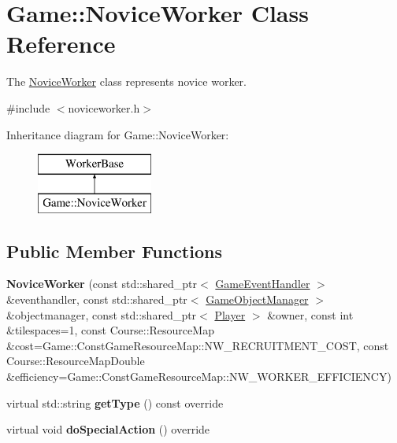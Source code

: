 \hypertarget{class_game_1_1_novice_worker}{\section{Game\-:\-:Novice\-Worker Class Reference}
\label{class_game_1_1_novice_worker}
}


The \hyperlink{class_game_1_1_novice_worker}{Novice\-Worker} class represents novice worker.  




{\ttfamily \#include $<$noviceworker.\-h$>$}

Inheritance diagram for Game\-:\-:Novice\-Worker\-:\begin{figure}[H]
\begin{center}
\leavevmode
\includegraphics[height=2.000000cm]{class_game_1_1_novice_worker}
\end{center}
\end{figure}
\subsection*{Public Member Functions}
\begin{DoxyCompactItemize}
\item 
\hypertarget{class_game_1_1_novice_worker_ab98dc21c53659739b108abf2f8e0db7a}{{\bfseries Novice\-Worker} (const std\-::shared\-\_\-ptr$<$ \hyperlink{class_game_1_1_game_event_handler}{Game\-Event\-Handler} $>$ \&eventhandler, const std\-::shared\-\_\-ptr$<$ \hyperlink{class_game_1_1_game_object_manager}{Game\-Object\-Manager} $>$ \&objectmanager, const std\-::shared\-\_\-ptr$<$ \hyperlink{class_game_1_1_player}{Player} $>$ \&owner, const int \&tilespaces=1, const Course\-::\-Resource\-Map \&cost=Game\-::\-Const\-Game\-Resource\-Map\-::\-N\-W\-\_\-\-R\-E\-C\-R\-U\-I\-T\-M\-E\-N\-T\-\_\-\-C\-O\-S\-T, const Course\-::\-Resource\-Map\-Double \&efficiency=Game\-::\-Const\-Game\-Resource\-Map\-::\-N\-W\-\_\-\-W\-O\-R\-K\-E\-R\-\_\-\-E\-F\-F\-I\-C\-I\-E\-N\-C\-Y)}\label{class_game_1_1_novice_worker_ab98dc21c53659739b108abf2f8e0db7a}

\item 
\hypertarget{class_game_1_1_novice_worker_a3a008e67e7a009bab02ac9f2a207b7b9}{virtual std\-::string {\bfseries get\-Type} () const override}\label{class_game_1_1_novice_worker_a3a008e67e7a009bab02ac9f2a207b7b9}

\item 
\hypertarget{class_game_1_1_novice_worker_a6cdefbee30452167a84f9a84b451386a}{virtual void {\bfseries do\-Special\-Action} () override}\label{class_game_1_1_novice_worker_a6cdefbee30452167a84f9a84b451386a}

\end{DoxyCompactItemize}


